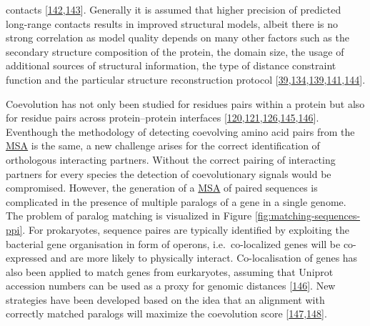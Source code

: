 \documentclass[11pt,a4paper,twoside]{book}
\theoremstyle{definition}
\theoremstyle{definition}
\theoremstyle{remark}
\begin{document}
contacts
{[}\protect\hyperlink{ref-Wang2016}{142},\protect\hyperlink{ref-Adhikari2015a}{143}{]}.
Generally it is assumed that higher precision of predicted long-range
contacts results in improved structural models, albeit there is no
strong correlation as model quality depends on many other factors such
as the secondary structure composition of the protein, the domain size,
the usage of additional sources of structural information, the type of
distance constraint function and the particular structure reconstruction
protocol
{[}\protect\hyperlink{ref-Marks2011}{39},\protect\hyperlink{ref-Kosciolek2014}{134},\protect\hyperlink{ref-Adhikari2017}{139},\protect\hyperlink{ref-Zhang2003}{141},\protect\hyperlink{ref-DeOliveira2016}{144}{]}.

Coevolution has not only been studied for residues pairs within a
protein but also for residue pairs across protein--protein interfaces
{[}\protect\hyperlink{ref-Ovchinnikov2014a}{120},\protect\hyperlink{ref-Hopf2014}{121},\protect\hyperlink{ref-Ovchinnikov2015a}{126},\protect\hyperlink{ref-Rodriguez-Rivas2016}{145},\protect\hyperlink{ref-Feinauer2016a}{146}{]}.
Eventhough the methodology of detecting coevolving amino acid pairs from
the \protect\hyperlink{abbrev}{MSA} is the same, a new challenge arises
for the correct identification of orthologous interacting partners.
Without the correct pairing of interacting partners for every species
the detection of coevolutionary signals would be compromised. However,
the generation of a \protect\hyperlink{abbrev}{MSA} of paired sequences
is complicated in the presence of multiple paralogs of a gene in a
single genome. The problem of paralog matching is visualized in Figure
\ref{fig:matching-sequences-ppi}. For prokaryotes, sequence paires are
typically identified by exploiting the bacterial gene organisation in
form of operons, i.e.~co-localized genes will be co-expressed and are
more likely to physically interact. Co-localisation of genes has also
been applied to match genes from eurkaryotes, assuming that Uniprot
accession numbers can be used as a proxy for genomic distances
{[}\protect\hyperlink{ref-Feinauer2016a}{146}{]}. New strategies have
been developed based on the idea that an alignment with correctly
matched paralogs will maximize the coevolution score
{[}\protect\hyperlink{ref-Gueudre2016}{147},\protect\hyperlink{ref-Bitbol2016}{148}{]}.
\end{document}
